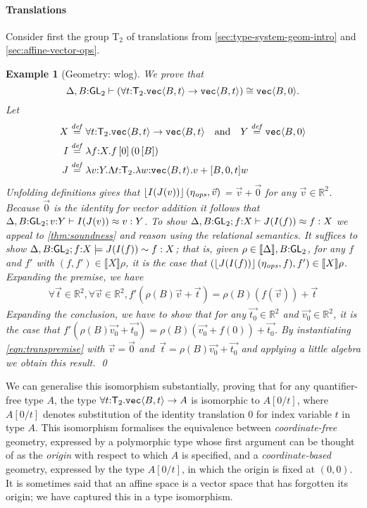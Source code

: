 \documentclass{sigplanconf}
\newcommand{\SynGL}[1]{\mathsf{GL}_#1}
\newcommand{\Transl}[1]{\mathrm{T}_#1}
\newcommand{\SynTransl}[1]{\mathsf{T}_#1}
\newcommand{\tyPrim}[2]{\textup{\texttt{#1}}\langle #2 \rangle}
\newcommand{\tmSem}[1]{\left\lfloor{#1}\right\rfloor}
\newcommand{\rsem}[1]{\llbracket #1 \rrbracket}
\newcommand{\isDefinedAs}{\stackrel{\mathit{def}}=}
\theoremstyle{examplestyle}
\newtheorem{example}{Example}
\theoremstyle{restatementstyle}
\begin{document}
\paragraph{Translations} 
Consider first the group $\Transl{2}$ of translations from
\autoref{sec:type-system-geom-intro} and 
\autoref{sec:affine-vector-ops}. 
\newcommand{\DeltaWithB}{\Delta,B\mathord:\SynGL{2}}

\begin{example}[Geometry: wlog]\label{ex:simpletrans}
We prove that
\[\DeltaWithB\vdash(\forall t\mathord:\SynTransl{2}.\tyPrim{vec}{B,t}\to\tyPrim{vec}{B,t}) \cong
\tyPrim{vec}{B,0}.
\]
Let 
\begin{align*}
X & \isDefinedAs\forall t\mathord:\SynTransl{2}.\tyPrim{vec}{B,t}\to\tyPrim{vec}{B,t}
\quad\text{and}\quad Y \isDefinedAs\tyPrim{vec}{B,0}\\
I & \isDefinedAs\lambda f\mathord:X.f\,[0]\,(0\,[B])\\
J & \isDefinedAs\lambda v\mathord:Y.\Lambda t\mathord:\SynTransl{2}.\lambda w\mathord:\tyPrim{vec}{B,t}.v +[B,0,t] w
\end{align*}
Unfolding definitions gives that $\tmSem{I(J(v))}(\opsEnv,\vec{v})$ = $\vec{v}+\vec{0}$
for any $\vec{v}\in\mathbb R ^ 2$.  Because $\vec{0}$ is the identity for vector
addition it follows that $\ctxteq{\DeltaWithB}{v\mathord:Y}{I(J(v))}{v}Y$.
To show $\ctxteq{\DeltaWithB}{f\mathord:X}{J(I(f))}{f}{X}$ we appeal to
\autoref{thm:soundness} and reason using the relational semantics.  It
suffices to show $\semeq{\DeltaWithB}{f\mathord:X}{J(I(f))}{f}{X}$; that
is, given $\rho\in\semSort\DeltaWithB$, for any $f$ and $f'$ with
$(f,f')\in\rsem X\rho$, it is the case that 
$(\tmSem{J(I(f))}(\opsEnv,f), f')\in\rsem X\rho$.
Expanding the premise, we have
\begin{eqnarray}\label{eqn:transpremise}
\forall \vec{t}\in \mathbb R ^ 2,
\forall \vec{v}\in \mathbb R ^ 2,
f'(\rho(B)\vec{v} + \vec{t}) = \rho(B)(f(\vec{v})) + \vec{t}
\end{eqnarray}
Expanding the conclusion, we have to show that for any
$\vec{t_0}\in\mathbb R^2$ and $\vec{v_0}\in\mathbb R^2$, it is the case that
$f'(\rho(B)\vec{v_0} + \vec{t_0}) = \rho(B)(\vec{v_0} + f(0)) + \vec{t_0}$.
By instantiating \autoref{eqn:transpremise} with
$\vec{v}=\vec{0}$ and~$\vec{t}=\rho(B)\vec{v_0}+\vec{t_0}$ and applying a little algebra we obtain this result.
\qed
\end{example}

We can generalise this isomorphism substantially, proving
that for any quantifier-free type $A$, 
the type $\forall t\mathord:\SynTransl{2}.\tyPrim{vec}{B,t}\to A$
is isomorphic to $A[0/t]$, where $A[0/t]$ 
denotes substitution of the identity translation $0$
for index variable $t$ in type $A$. This isomorphism formalises the
equivalence between \emph{coordinate-free} geometry, expressed by a
polymorphic type whose first argument can be thought of as the
\emph{origin} with respect to which $A$ is specified, and a
\emph{coordinate-based} geometry, expressed by the type $A[0/t]$, in
which the origin is fixed at $(0,0)$. It is sometimes said that an
affine space is a vector space that has forgotten its origin; we have
captured this in a type isomorphism.
\end{document}
